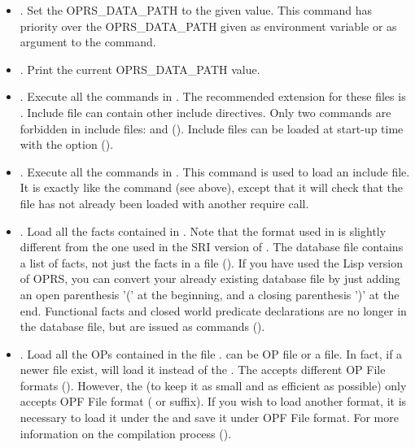 \begin{itemize}

\item {}. Set the OPRS\_DATA\_PATH to the given
value. This command has priority over the OPRS\_DATA\_PATH given as environment
variable or as argument to the  command.

\item {}. Print the current OPRS\_DATA\_PATH value.

\item {}. Execute all the commands in
. The recommended extension for these files is .
Include file can contain other include directives. Only two commands are
forbidden in include files:  and 
(). Include files can be loaded at start-up time with the  option
().

\item {}. Execute all the commands in .
This command is used to load an include file. It is exactly like the
 command (see above), except that it will check that
the file has not already been loaded with another require call.

\item {}. Load all the facts contained in
. Note that the format used in \COPRSDE{} is slightly different
from the one used in the SRI version of \OPRS{}. The database file contains a list of facts,
not just the facts in a file (). If you have used
the Lisp version of OPRS, you can convert your already existing database file by
just adding an open parenthesis '(' at the beginning, and a closing parenthesis
')' at the end. Functional facts and closed world predicate declarations are no
longer in the database file, but are issued as commands ().

\item {}. Load all the OPs contained in the
  file .  can be  OP file or a
   file. In fact, if a newer  file exist, \CPK{}
  will load it instead of the . The \OPEditor{} accepts different
  OP File formats (). However, the \CPK{} (to keep it
  as small and as efficient as possible) only accepts OPF File format
  ( or  suffix). If you wish to load another format,
  it is necessary to load it under the \OPEditor{} and save it under OPF
  File format. For more information on the compilation process
  ().


\end{itemize}
